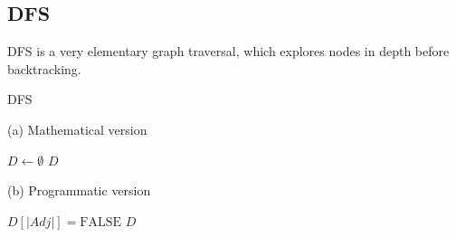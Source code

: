 \subsection{\texorpdfstring{\Acrlong*{DFS}}{Depth-first search}} \label{algorithm-reachability-dfs}
\Acrlong*{DFS} is a very elementary graph traversal, which explores nodes in depth before backtracking.
\begin{algorithm}[h]
    \caption{\Acrlong*{DFS}}
    \label{alg-dfs}
    \begin{minipage}[t]{0.49\linewidth}
        (a) Mathematical version
        \begin{algorithmic}[1]
            \State $D \gets \emptyset$
                 \Return {$ $}
                \EndIf 
                \EndFor
                \State \Return $D$
            \EndFunction
        \end{algorithmic}
    \end{minipage}
    \begin{minipage}[t]{0.49\linewidth}
        (b) Programmatic version
        \begin{algorithmic}[1]
            \State $D[|Adj|] = \text{FALSE}$
                 \Return {$ $}
                \EndIf 
                \EndFor
                \State \Return $D$
            \EndFunction
        \end{algorithmic}
    \end{minipage}
\end{algorithm}
